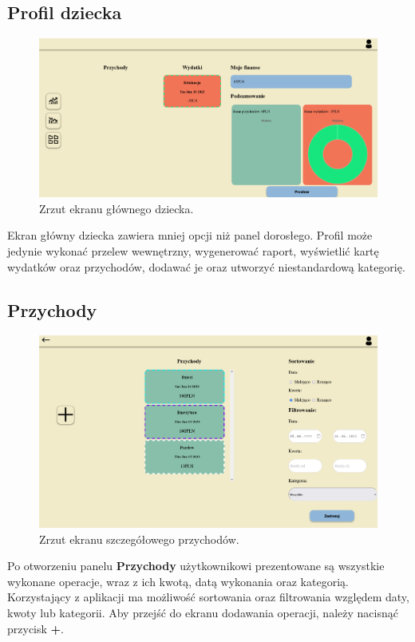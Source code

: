 \documentclass[12pt,a4paper,oneside]{article}
\begin{document}
\subsection{Profil dziecka}
\begin{figure}[H]
    \centering
    \includegraphics[width=\hsize,keepaspectratio]{images/childs_profile.png}
    \caption{Zrzut ekranu głównego dziecka.}
\end{figure}
Ekran główny dziecka zawiera mniej opcji niż panel dorosłego. Profil może
jedynie wykonać przelew wewnętrzny, wygenerować raport, wyświetlić kartę
wydatków oraz przychodów, dodawać je oraz utworzyć niestandardową kategorię.

\subsection{Przychody}
\begin{figure}[H]
    \centering
    \includegraphics[width=\hsize,keepaspectratio]{images/incomes_card.png}
    \caption{Zrzut ekranu szczegółowego przychodów.}
\end{figure}
Po otworzeniu panelu \textbf{Przychody} użytkownikowi prezentowane są wszystkie
wykonane operacje, wraz z ich kwotą, datą wykonania oraz kategorią. Korzystający
z aplikacji ma możliwość sortowania oraz filtrowania względem daty, kwoty lub
kategorii. Aby przejść do ekranu dodawania operacji, należy nacisnąć przycisk
\textbf{+}.
\end{document}
